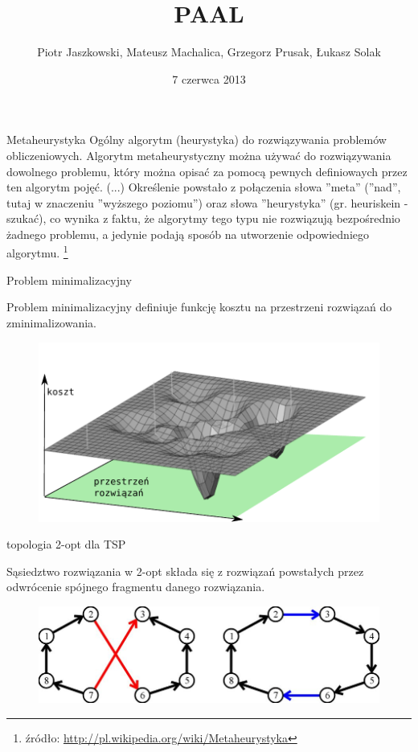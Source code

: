 \documentclass[blue]{beamer}
\title{PAAL}
\author{Piotr Jaszkowski, Mateusz Machalica, Grzegorz Prusak, Łukasz Solak}
\date{7 czerwca 2013}
\begin{document}

\begin{frame}
\titlepage
\end{frame}

\begin{frame}
\begin{block}{Metaheurystyka}
Ogólny algorytm (heurystyka) do rozwiązywania problemów obliczeniowych.
Algorytm metaheurystyczny można używać do rozwiązywania dowolnego problemu,
który można opisać za pomocą pewnych definiowaych przez ten algorytm pojęć. (...)
Określenie powstało z połączenia słowa ''meta'' (''nad'', tutaj w znaczeniu ''wyższego poziomu'')
oraz słowa ''heurystyka'' (gr. heuriskein - szukać), co wynika z faktu, że algorytmy
tego typu nie rozwiązują bezpośrednio żadnego problemu, a jedynie podają sposób na utworzenie odpowiedniego algorytmu.
\footnote{źródło: \url{http://pl.wikipedia.org/wiki/Metaheurystyka}}
\end{block}
\end{frame}

\begin{frame}{Problem minimalizacyjny}
\begin{block}{Problem minimalizacyjny}
definiuje funkcję kosztu na przestrzeni rozwiązań do zminimalizowania.
\end{block}
\begin{figure}
\includegraphics[scale=.7]{ss1.pdf}
\end{figure}
\end{frame}

\begin{frame}{topologia 2-opt dla TSP}
\begin{block}{Sąsiedztwo rozwiązania w 2-opt}
składa się z rozwiązań
powstałych przez odwrócenie spójnego
fragmentu danego rozwiązania.
\end{block}
\begin{figure}
\includegraphics[scale=.7]{2opt.jpg}
\end{figure}
\end{frame}
\end{document}

